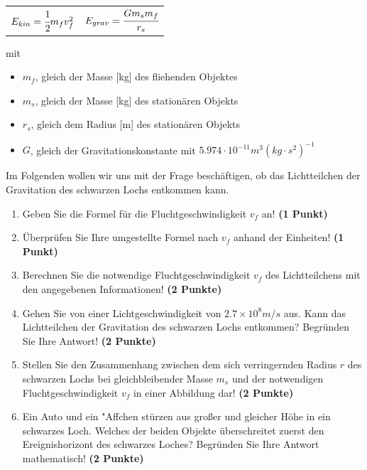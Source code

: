 \documentclass[a4paper, 9pt]{scrartcl}\usepackage[]{graphicx}\usepackage[]{xcolor}
\begin{document}
\begin{center}
  \begin{tabular}{cc}
    $E_{kin} = \cfrac{1}{2}m_fv_f^2$ & $E_{grav} = \cfrac{Gm_sm_f}{r_s}$\\
  \end{tabular}
\end{center}

mit

\begin{itemize}[noitemsep]
\item $m_f$, gleich der Masse [kg] des fliehenden Objektes
\item $m_s$, gleich der Masse [kg] des station{\"a}ren Objekts
\item $r_s$, gleich dem Radius [m] des station{\"a}ren Objekts  
\item $G$, gleich der Gravitationskonstante mit $5.974 \cdot 10^{-11}
  m^3(kg \cdot s^2)^{-1}$ 
\end{itemize}

Im Folgenden wollen wir uns mit der Frage besch{\"a}ftigen, ob das
Lichtteilchen der Gravitation des schwarzen Lochs entkommen kann.

\begin{enumerate}
\item Geben Sie die Formel f{\"u}r die Fluchtgeschwindigkeit $v_f$ an! 
  \textbf{(1 Punkt)}
\item {\"U}berpr{\"u}fen Sie Ihre umgestellte Formel nach $v_f$ anhand der Einheiten!
  \textbf{(1 Punkt)} 
\item Berechnen Sie die notwendige Fluchtgeschwindigkeit $v_f$ des
  Lichtteilchens mit den angegebenen Informationen! \textbf{(2 Punkte)}
\item Gehen Sie von einer Lichtgeschwindigkeit von $\ensuremath{2.7\times 10^{8}}m/s$
  aus. Kann das Lichtteilchen der Gravitation des schwarzen Lochs
  entkommen? Begr{\"u}nden Sie Ihre Antwort! \textbf{(2 Punkte)}
\item Stellen Sie den Zusammenhang zwischen dem sich verringernden Radius
  $r$ des schwarzen Lochs bei gleichbleibender Masse $m_s$
  und der notwendigen Fluchtgeschwindigkeit $v_f$ in einer Abbildung dar!
  \textbf{(2 Punkte)}
 \item Ein Auto und ein {"A}ffchen st{\"u}rzen aus gro{\ss}er und gleicher H{\"o}he
  in ein schwarzes Loch. Welches der beiden Objekte {\"u}berschreitet zuerst
  den Ereignishorizont des schwarzes Loches? Begr{\"u}nden
  Sie Ihre Antwort mathematisch! \textbf{(2 Punkte)}  
\end{enumerate}
\end{document}
